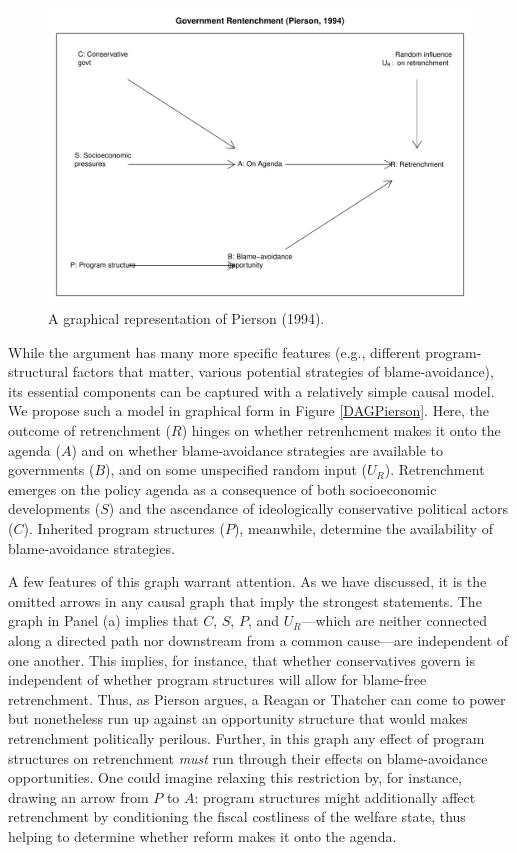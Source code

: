 \documentclass[12pt,]{book}
\begin{document}
\begin{figure}

{\centering \includegraphics[width=.7\textwidth]{ii_files/figure-latex/unnamed-chunk-7-1} 

}

\caption{\label{fig:DAGPierson} A graphical representation of Pierson (1994).}\label{fig:unnamed-chunk-7}
\end{figure}

While the argument has many more specific features (e.g., different program-structural factors that matter, various potential strategies of blame-avoidance), its essential components can be captured with a relatively simple causal model. We propose such a model in graphical form in Figure \ref{DAGPierson}. Here, the outcome of retrenchment (\(R\)) hinges on whether retrenhcment makes it onto the agenda (\(A\)) and on whether blame-avoidance strategies are available to governments (\(B\)), and on some unspecified random input (\(U_R\)). Retrenchment emerges on the policy agenda as a consequence of both socioeconomic developments (\(S\)) and the ascendance of ideologically conservative political actors (\(C\)). Inherited program structures (\(P\)), meanwhile, determine the availability of blame-avoidance strategies.

A few features of this graph warrant attention. As we have discussed, it is the omitted arrows in any causal graph that imply the strongest statements. The graph in Panel (a) implies that \(C\), \(S\), \(P\), and \(U_R\)---which are neither connected along a directed path nor downstream from a common cause---are independent of one another. This implies, for instance, that whether conservatives govern is independent of whether program structures will allow for blame-free retrenchment. Thus, as Pierson argues, a Reagan or Thatcher can come to power but nonetheless run up against an opportunity structure that would makes retrenchment politically perilous. Further, in this graph any effect of program structures on retrenchment \emph{must} run through their effects on blame-avoidance opportunities. One could imagine relaxing this restriction by, for instance, drawing an arrow from \(P\) to \(A\): program structures might additionally affect retrenchment by conditioning the fiscal costliness of the welfare state, thus helping to determine whether reform makes it onto the agenda.
\end{document}
